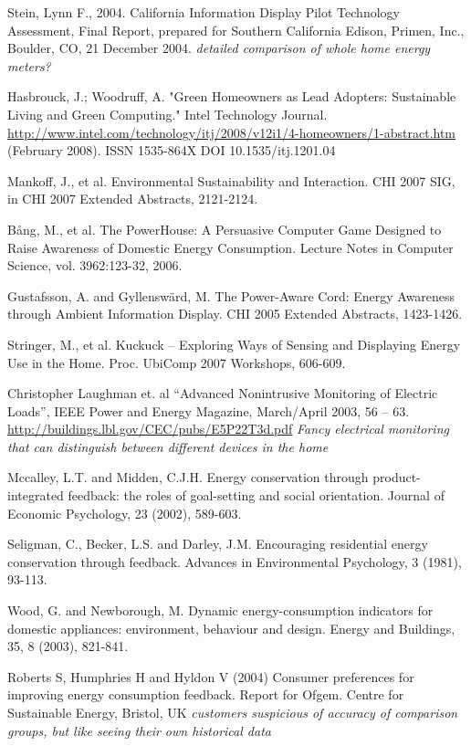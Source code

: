Stein, Lynn F., 2004. California Information Display Pilot Technology Assessment, Final Report, prepared for Southern California Edison, Primen, Inc., Boulder, CO, 21 December 2004. \emph{detailed comparison of whole home energy meters?}

Hasbrouck, J.; Woodruff, A. "Green Homeowners as Lead Adopters: Sustainable Living and Green Computing." Intel Technology Journal. \url{http://www.intel.com/technology/itj/2008/v12i1/4-homeowners/1-abstract.htm} (February 2008). ISSN 1535-864X DOI 10.1535/itj.1201.04

Mankoff, J., et al.  Environmental Sustainability and Interaction.  CHI 2007 SIG, in CHI 2007 Extended Abstracts, 2121-2124.

Bång, M., et al. The PowerHouse: A Persuasive Computer Game Designed to Raise Awareness of Domestic Energy Consumption.  Lecture Notes in Computer Science, vol. 3962:123-32, 2006.

Gustafsson, A. and Gyllenswärd, M. The Power-Aware Cord: Energy Awareness through Ambient Information Display. CHI 2005 Extended Abstracts, 1423-1426.

Stringer, M., et al.  Kuckuck – Exploring Ways of Sensing and Displaying Energy Use in the Home.  Proc. UbiComp 2007 Workshops, 606-609.

Christopher Laughman et. al ``Advanced Nonintrusive Monitoring of Electric Loads'', IEEE Power and Energy Magazine, March/April 2003, 56 – 63. \url{http://buildings.lbl.gov/CEC/pubs/E5P22T3d.pdf} \emph{Fancy electrical monitoring that can distinguish between different devices in the home}

Mccalley, L.T. and Midden, C.J.H. Energy conservation through product-integrated feedback: the roles of goal-setting and social orientation. Journal of Economic Psychology, 23 (2002), 589-603.

Seligman, C., Becker, L.S. and Darley, J.M. Encouraging residential energy conservation through feedback. Advances in Environmental Psychology, 3 (1981), 93-113.

Wood, G. and Newborough, M. Dynamic energy-consumption indicators for domestic appliances: environment, behaviour and design. Energy and Buildings, 35, 8 (2003), 821-841.

Roberts S, Humphries H and Hyldon V (2004) Consumer preferences for improving energy consumption feedback. Report for Ofgem. Centre for Sustainable Energy, Bristol, UK \emph{customers suspicious of accuracy of comparison groups, but like seeing their own historical data}

